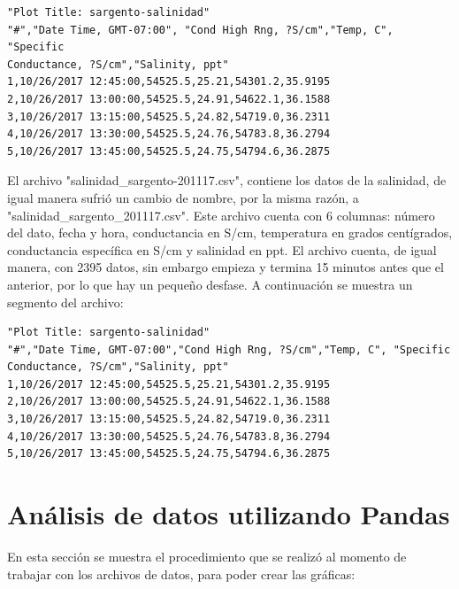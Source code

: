 \documentclass[12pt]{article}
\begin{document}
\begin{verbatim}
"Plot Title: sargento-salinidad"
"#","Date Time, GMT-07:00", "Cond High Rng, ?S/cm","Temp, C", "Specific 
Conductance, ?S/cm","Salinity, ppt"
1,10/26/2017 12:45:00,54525.5,25.21,54301.2,35.9195
2,10/26/2017 13:00:00,54525.5,24.91,54622.1,36.1588
3,10/26/2017 13:15:00,54525.5,24.82,54719.0,36.2311
4,10/26/2017 13:30:00,54525.5,24.76,54783.8,36.2794
5,10/26/2017 13:45:00,54525.5,24.75,54794.6,36.2875
\end{verbatim}

El archivo "salinidad\_sargento-201117.csv", contiene los datos de la salinidad, de igual manera sufrió un cambio de nombre, por la misma razón, a "salinidad\_sargento\_201117.csv". Este archivo cuenta con 6 columnas: número del dato, fecha y hora, conductancia en S/cm, temperatura en grados centígrados, conductancia específica en S/cm y salinidad en ppt. El archivo cuenta, de igual manera, con 2395 datos, sin embargo empieza y termina 15 minutos antes que el anterior, por lo que hay un pequeño desfase. A continuación se muestra un segmento del archivo:

\begin{verbatim}
"Plot Title: sargento-salinidad"
"#","Date Time, GMT-07:00","Cond High Rng, ?S/cm","Temp, C", "Specific 
Conductance, ?S/cm","Salinity, ppt"
1,10/26/2017 12:45:00,54525.5,25.21,54301.2,35.9195
2,10/26/2017 13:00:00,54525.5,24.91,54622.1,36.1588
3,10/26/2017 13:15:00,54525.5,24.82,54719.0,36.2311
4,10/26/2017 13:30:00,54525.5,24.76,54783.8,36.2794
5,10/26/2017 13:45:00,54525.5,24.75,54794.6,36.2875
\end{verbatim}

\clearpage

\section{Análisis de datos utilizando Pandas}

En esta sección se muestra el procedimiento que se realizó al momento de trabajar con los archivos de datos, para poder crear las gráficas: 
\end{document}
